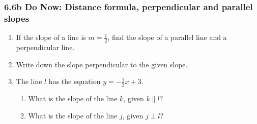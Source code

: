 \documentclass[12pt, twoside]{article}
\begin{document}
\subsubsection*{6.6b Do Now: Distance formula, perpendicular and parallel slopes}
  \begin{enumerate}

  \item If the slope of a line is $m=\frac{1}{2}$, find the slope of a parallel line and a perpendicular line.
  \begin{enumerate}
  \end{enumerate} \vspace{1cm}
  
  \item Write down the slope perpendicular to the given slope.
  \begin{enumerate}
  \end{enumerate} \vspace{1cm}

  
  \item The line $l$ has the equation $y=-\frac{1}{2} x+3$.
  \begin{enumerate}
    \item What is the slope of the line $k$, given $k \parallel l$?
    \vspace{1.3cm}
    \item What is the slope of the line $j$, given $j \perp l$?
    \vspace{1.3cm}
  \end{enumerate}
   

\end{enumerate}
\end{document}
